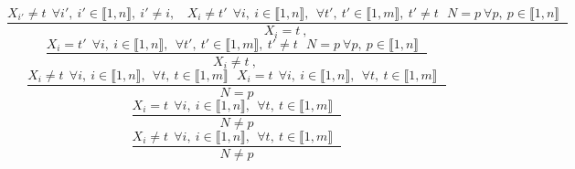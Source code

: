 $$\frac{X_{i'} \neq t~~\forall i',~i' \in \llbracket1,n\rrbracket,~i' \neq i,~~~~X_{i} \neq t'~~\forall i,~i \in \llbracket1,n\rrbracket,~~\forall t',~t' \in \llbracket1,m\rrbracket,~t' \neq t~~~N=p ~\forall p,~p \in \llbracket1,n\rrbracket~~~}{X_{i}=t~,~}$$ $$\frac{X_{i}=t'~~\forall i,~i \in \llbracket1,n\rrbracket,~~\forall t',~t' \in \llbracket1,m\rrbracket,~t' \neq t~~~N=p ~\forall p,~p \in \llbracket1,n\rrbracket~~~}{X_{i} \neq t~,~}$$ $$\frac{X_{i} \neq t~~\forall i,~i \in \llbracket1,n\rrbracket,~~\forall t,~t \in \llbracket1,m\rrbracket~~~X_{i}=t~~\forall i,~i \in \llbracket1,n\rrbracket,~~\forall t,~t \in \llbracket1,m\rrbracket~~~}{N=p }$$ $$\frac{X_{i}=t~~\forall i,~i \in \llbracket1,n\rrbracket,~~\forall t,~t \in \llbracket1,m\rrbracket~~~}{N \neq p }$$ $$\frac{X_{i} \neq t~~\forall i,~i \in \llbracket1,n\rrbracket,~~\forall t,~t \in \llbracket1,m\rrbracket~~~}{N \neq p }$$ 